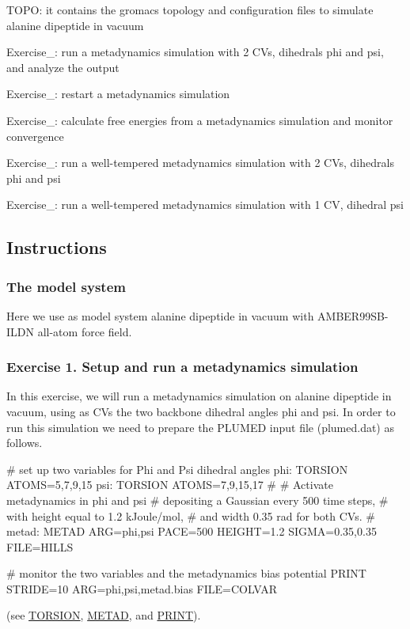 \begin{DoxyItemize}
\item T\+O\+P\+O\+: it contains the gromacs topology and configuration files to simulate alanine dipeptide in vacuum
\item Exercise\+\_\+: run a metadynamics simulation with 2 C\+Vs, dihedrals phi and psi, and analyze the output
\item Exercise\+\_\+: restart a metadynamics simulation
\item Exercise\+\_\+: calculate free energies from a metadynamics simulation and monitor convergence
\item Exercise\+\_\+: run a well-\/tempered metadynamics simulation with 2 C\+Vs, dihedrals phi and psi
\item Exercise\+\_\+: run a well-\/tempered metadynamics simulation with 1 C\+V, dihedral psi
\end{DoxyItemize}\hypertarget{belfast-6_belfast-6-instructions}{}\subsection{Instructions}\label{belfast-6_belfast-6-instructions}
\hypertarget{belfast-6_belfast-6-system}{}\subsubsection{The model system}\label{belfast-6_belfast-6-system}
Here we use as model system alanine dipeptide in vacuum with A\+M\+B\+E\+R99\+S\+B-\/\+I\+L\+D\+N all-\/atom force field.\hypertarget{belfast-6_belfast-6-exercise-1}{}\subsubsection{Exercise 1. Setup and run a metadynamics simulation}\label{belfast-6_belfast-6-exercise-1}
In this exercise, we will run a metadynamics simulation on alanine dipeptide in vacuum, using as C\+Vs the two backbone dihedral angles phi and psi. In order to run this simulation we need to prepare the P\+L\+U\+M\+E\+D input file (plumed.\+dat) as follows.

\begin{DoxyVerb}# set up two variables for Phi and Psi dihedral angles 
phi: TORSION ATOMS=5,7,9,15
psi: TORSION ATOMS=7,9,15,17
#
# Activate metadynamics in phi and psi
# depositing a Gaussian every 500 time steps,
# with height equal to 1.2 kJoule/mol,
# and width 0.35 rad for both CVs. 
#
metad: METAD ARG=phi,psi PACE=500 HEIGHT=1.2 SIGMA=0.35,0.35 FILE=HILLS 

# monitor the two variables and the metadynamics bias potential
PRINT STRIDE=10 ARG=phi,psi,metad.bias FILE=COLVAR\end{DoxyVerb}
 (see \hyperlink{TORSION}{T\+O\+R\+S\+I\+O\+N}, \hyperlink{METAD}{M\+E\+T\+A\+D}, and \hyperlink{PRINT}{P\+R\+I\+N\+T}).


